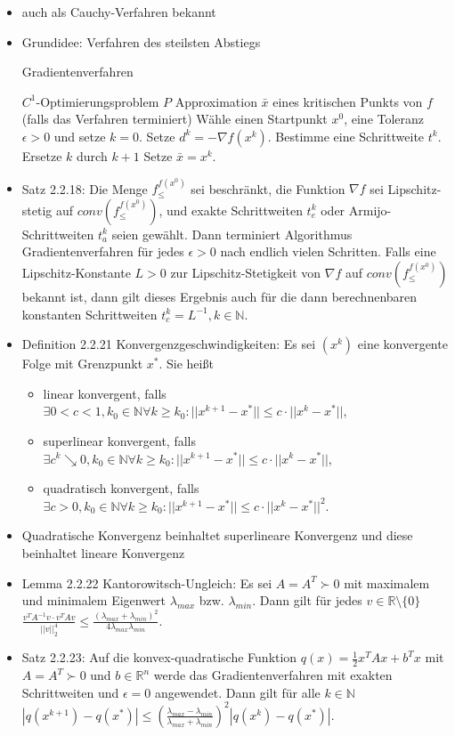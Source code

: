 \documentclass[paper=a4, fontsize=11pt]{scrartcl} %
\numberwithin{equation}{section} %
\numberwithin{figure}{section} %
\numberwithin{table}{section} %
\begin{document}
\begin{itemize}
\item auch als Cauchy-Verfahren bekannt
\item Grundidee: Verfahren des steilsten Abstiegs
\begin{algorithm}
\caption{Gradientenverfahren}
\begin{algorithmic}[1]
  \Require $C^1$-Optimierungsproblem $P$
  \Ensure Approximation $\bar{x}$ eines kritischen Punkts von $f$ (falls das Verfahren terminiert)
  \State Wähle einen Startpunkt $x^0$, eine Toleranz $\epsilon > 0$ und setze $k = 0$.
  \State Setze $d^k = - \nabla f(x^k)$.
  \State Bestimme eine Schrittweite $t^k$.
  \State Ersetze $k$ durch $k+1$
  \EndWhile
  \State Setze $\bar{x} = x^k$.
\end{algorithmic}
\end{algorithm}
\item Satz 2.2.18: Die Menge $f^{f(x^0)}_\le$ sei beschränkt, die Funktion $\nabla f$ sei Lipschitz-stetig auf $conv(f^{f(x^0)}_\le)$, und exakte Schrittweiten $t_e^k$ oder Armijo-Schrittweiten $t_a^k$ seien gewählt. Dann terminiert Algorithmus Gradientenverfahren für jedes $\epsilon > 0$ nach endlich vielen Schritten. Falls eine Lipschitz-Konstante $L > 0$ zur Lipschitz-Stetigkeit von $\nabla f$ auf $conv(f^{f(x^0)}_\le)$ bekannt ist, dann gilt dieses Ergebnis auch für die dann berechnenbaren konstanten Schrittweiten $t_c^k = L^{-1}, k \in \mathbb{N}$.
\item Definition 2.2.21 Konvergenzgeschwindigkeiten: Es sei $(x^k)$ eine konvergente Folge mit Grenzpunkt $x^*$. Sie heißt
\begin{itemize}
  \item linear konvergent, falls $\exists 0 < c < 1, k_0 \in \mathbb{N} \forall k \ge k_0: ||x^{k+1} - x^*|| \le c \cdot ||x^k-x^*||$,
  \item superlinear konvergent, falls $\exists c^k \searrow 0, k_0 \in \mathbb{N} \forall k \ge k_0:||x^{k+1} - x^*|| \le c \cdot ||x^k-x^*||$,
  \item quadratisch konvergent, falls $\exists c > 0, k_0 \in \mathbb{N} \forall k \ge k_0: ||x^{k+1} - x^*|| \le c \cdot ||x^k-x^*||^2$.
\end{itemize}
\item Quadratische Konvergenz beinhaltet superlineare Konvergenz und diese beinhaltet lineare Konvergenz
\item Lemma 2.2.22 Kantorowitsch-Ungleich: Es sei $A = A^T \succ 0$ mit maximalem und minimalem Eigenwert $\lambda_{max}$ bzw. $\lambda_{min}$. Dann gilt für jedes $v \in \mathbb{R} \setminus \{0\}$ $\frac{v^T A^{-1}v \cdot v^T A v}{||v||^4_2} \le \frac{(\lambda_{max} + \lambda_{min})^2}{4 \lambda_{max}\lambda_{min}}$.
\item Satz 2.2.23: Auf die konvex-quadratische Funktion $q(x) = \frac{1}{2} x^T Ax + b^T x$ mit $A = A^T \succ 0$ und $b \in \mathbb{R}^n$ werde das Gradientenverfahren mit exakten Schrittweiten und $\epsilon = 0$ angewendet. Dann gilt für alle $k \in \mathbb{N}$ $|q(x^{k+1})-q(x^*)| \le (\frac{\lambda_{max}-\lambda_{min}}{\lambda_{max}+\lambda_{min}})^2 |q(x^k) - q(x^*)|$.
\end{itemize}
\end{document}
